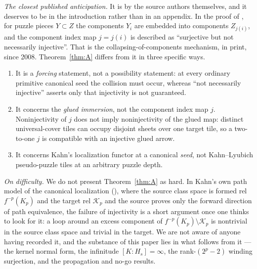 \documentclass[11pt,reqno]{amsart}
\theoremstyle{definition}
\theoremstyle{remark}
\begin{document}
\emph{The closest published anticipation.}  It is by the source authors
themselves, and it deserves to be in the introduction rather than in an
appendix.  In the proof of \cite[\S3.2.2, Lemma~3.4(ii), p.~68 of the
journal pagination]{KLDecorations08}, for puzzle pieces $Y\subset Z$ the
components $Y_{i}$ are embedded into components $Z_{j(i)}$, and the
component index map $j=j(i)$ is described as ``surjective but not
necessarily injective''.  That is the collapsing-of-components
mechanism, in print, since 2008.  Theorem~\ref{thm:A} differs from it in
three specific ways.
\begin{enumerate}
\item[(1)] It is a \emph{forcing} statement, not a possibility
  statement: at every ordinary primitive canonical seed the collision
  must occur, whereas ``not necessarily injective'' asserts only that
  injectivity is not guaranteed.
\item[(2)] It concerns the \emph{glued immersion}, not the component
  index map $j$.  Noninjectivity of $j$ does not imply noninjectivity of
  the glued map: distinct universal-cover tiles can occupy disjoint
  sheets over one target tile, so a two-to-one $j$ is compatible with
  an injective glued arrow.
\item[(3)] It concerns Kahn's localization functor at a canonical
  \emph{seed}, not Kahn--Lyubich pseudo-puzzle tiles at an arbitrary
  puzzle depth.
\end{enumerate}

\emph{On difficulty.}  We do not present Theorem~\ref{thm:A} as hard.
In Kahn's own path model of the canonical localization
(\cite[\S7.4.5, pp.~46--47]{KahnPrimitive06}), where the source class
space is formed rel $f^{-p}(K_{p})$ and the target rel $\mathcal K_{p}$
and the source proves only the forward direction of path equivalence,
the failure of injectivity is a short argument once one thinks to look
for it: a loop around an excess component of
$f^{-p}(K_{p})\setminus\mathcal K_{p}$ is nontrivial in the source
class space and trivial in the target.  We are not aware of anyone
having recorded it, and the substance of this paper lies in what
follows from it --- the kernel normal form, the infinitude
$[K:H_{s}]=\infty$, the rank-$(2^{p}-2)$ winding surjection, and the
propagation and no-go results.
\end{document}
